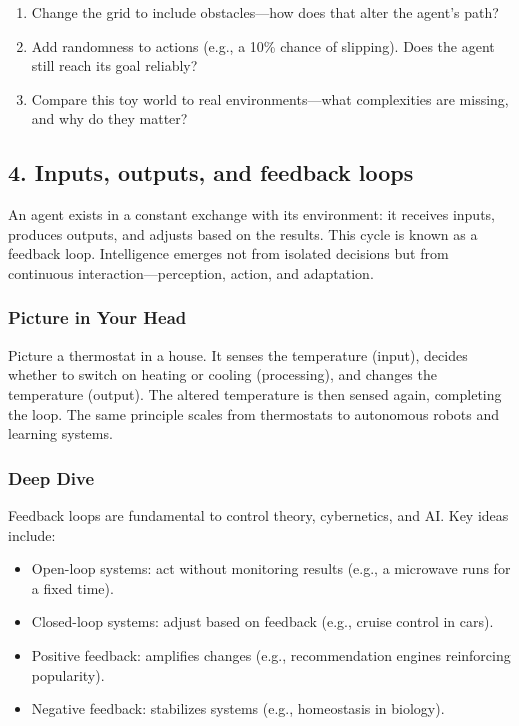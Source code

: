\documentclass[
  letterpaper,
  DIV=11,
  numbers=noendperiod]{scrreprt}
\providecommand{\tightlist}{%
  \setlength{\itemsep}{0pt}\setlength{\parskip}{0pt}}
\begin{document}
\begin{enumerate}
\def\labelenumi{\arabic{enumi}.}
\tightlist
\item
  Change the grid to include obstacles---how does that alter the agent's
  path?
\item
  Add randomness to actions (e.g., a 10\% chance of slipping). Does the
  agent still reach its goal reliably?
\item
  Compare this toy world to real environments---what complexities are
  missing, and why do they matter?
\end{enumerate}

\subsection{4. Inputs, outputs, and feedback
loops}\label{inputs-outputs-and-feedback-loops}

An agent exists in a constant exchange with its environment: it receives
inputs, produces outputs, and adjusts based on the results. This cycle
is known as a feedback loop. Intelligence emerges not from isolated
decisions but from continuous interaction---perception, action, and
adaptation.

\subsubsection{Picture in Your Head}\label{picture-in-your-head-3}

Picture a thermostat in a house. It senses the temperature (input),
decides whether to switch on heating or cooling (processing), and
changes the temperature (output). The altered temperature is then sensed
again, completing the loop. The same principle scales from thermostats
to autonomous robots and learning systems.

\subsubsection{Deep Dive}\label{deep-dive-3}

Feedback loops are fundamental to control theory, cybernetics, and AI.
Key ideas include:

\begin{itemize}
\tightlist
\item
  Open-loop systems: act without monitoring results (e.g., a microwave
  runs for a fixed time).
\item
  Closed-loop systems: adjust based on feedback (e.g., cruise control in
  cars).
\item
  Positive feedback: amplifies changes (e.g., recommendation engines
  reinforcing popularity).
\item
  Negative feedback: stabilizes systems (e.g., homeostasis in biology).
\end{itemize}
\end{document}
